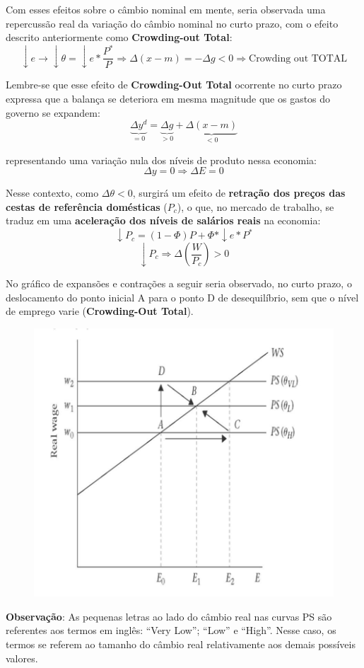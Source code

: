 \documentclass[a4paper,12pt]{article}[abntex2]
\begin{document}
Com esses efeitos sobre o câmbio nominal em mente, seria observada uma repercussão real da variação do câmbio nominal no curto prazo, com o efeito descrito anteriormente como \textbf{Crowding-out Total}:
\[
\downarrow e \rightarrow \downarrow \theta = \downarrow e \ast \frac{P^*}{P} 
\Rightarrow \Delta (x - m) = -\Delta g < 0 \Rightarrow \text{Crowding out TOTAL}
\]

Lembre-se que esse efeito de \textbf{Crowding-Out Total} ocorrente no curto prazo expressa que a balança se deteriora em mesma magnitude que os gastos do governo se expandem:
\[
\underbrace{\Delta y^d}_{=0} = \underbrace{\Delta g}_{>0} + \underbrace{\Delta (x - m)}_{<0}
\]

representando uma variação nula dos níveis de produto nessa economia:
\[
\Delta y = 0 \Rightarrow \Delta E = 0
\]

Nesse contexto, como $\Delta \theta < 0$, surgirá um efeito de \textbf{retração dos preços das cestas de referência domésticas} ($P_c$), o que, no mercado de trabalho, se traduz em uma \textbf{aceleração dos níveis de salários reais} na economia:
\[
\downarrow P_c = (1 - \Phi)P + \Phi \ast \downarrow e \ast P^*
\]
\[
\downarrow P_c \Rightarrow \Delta \left( \frac{W}{P_c} \right) > 0
\]

No gráfico de expansões e contrações a seguir seria observado, no curto prazo, o deslocamento do ponto inicial A para o ponto D de desequilíbrio, sem que o nível de emprego varie (\textbf{Crowding-Out Total}).

\begin{figure}[H]
    \centering
    \includegraphics[width=0.7\linewidth]{Imagens/a25i3.png}
\end{figure}

\textbf{Observação}: As pequenas letras ao lado do câmbio real nas curvas PS são referentes aos termos em inglês: “Very Low”; “Low” e “High”. Nesse caso, os termos se referem ao tamanho do câmbio real relativamente aos demais possíveis valores. 
\end{document}
